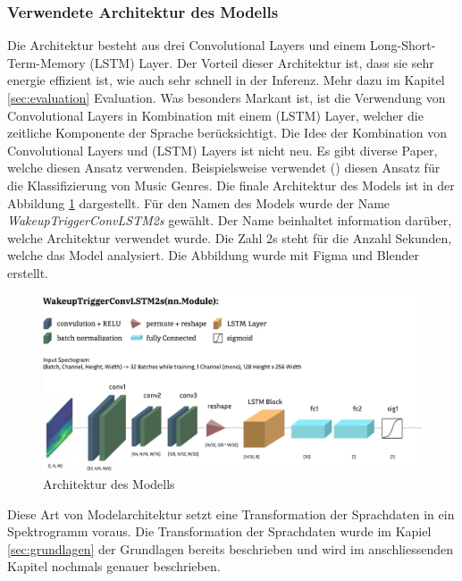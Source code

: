 \documentclass[11pt,a4paper]{article}
\begin{document}
\subsubsection{Verwendete Architektur des Modells}
Die Architektur besteht aus drei Convolutional Layers und einem Long-Short-Term-Memory 
(LSTM) Layer. Der Vorteil dieser Architektur ist, dass sie sehr energie effizient ist, wie auch sehr 
schnell in der Inferenz. Mehr dazu im Kapitel \ref{sec:evaluation} Evaluation. Was besonders Markant 
ist, ist die Verwendung von Convolutional Layers in Kombination mit einem (LSTM) Layer, welcher die 
zeitliche Komponente der Sprache berücksichtigt. Die Idee der Kombination von Convolutional Layers 
und (LSTM) Layers ist nicht neu. Es gibt diverse Paper, welche diesen Ansatz verwenden. 
Beispielsweise verwendet (\cite{khamees2021classifying}) diesen Ansatz für die Klassifizierung von 
Music Genres. Die finale Architektur des Models ist in der Abbildung \ref{fig:model_architecture} 
dargestellt. Für den Namen des Models wurde der Name \textit{WakeupTriggerConvLSTM2s} gewählt. Der 
Name beinhaltet information darüber, welche Architektur verwendet wurde. Die Zahl 2s steht für die 
Anzahl Sekunden, welche das Model analysiert. Die Abbildung wurde mit Figma und Blender erstellt.

\begin{figure}[h]
	\centering
	\includegraphics[width=1.0\linewidth]{img/model_architecture.pdf}
	\caption{Architektur des Modells}
	\label{fig:model_architecture}
\end{figure}

\noindent \newline
Diese Art von Modelarchitektur setzt eine Transformation der Sprachdaten in ein Spektrogramm voraus.
Die Transformation der Sprachdaten wurde im Kapiel \ref{sec:grundlagen} der Grundlagen bereits
beschrieben und wird im anschliessenden Kapitel nochmals genauer beschrieben.
\end{document}
